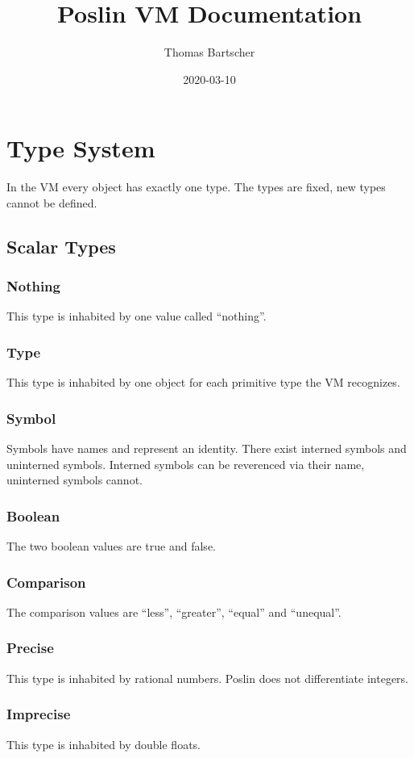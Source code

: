 \documentclass[a4paper]{article}
\begin{document}
\title{Poslin VM Documentation}
\author{Thomas Bartscher}
\date{2020-03-10}
\maketitle

\tableofcontents


\section{Type System}
In the VM every object has exactly one type. The types are fixed, new types
cannot be defined.

\subsection{Scalar Types}
\subsubsection{Nothing}
This type is inhabited by one value called ``nothing''.
\subsubsection{Type}
This type is inhabited by one object for each primitive type the VM recognizes.
\subsubsection{Symbol}
Symbols have names and represent an identity. There exist interned symbols and
uninterned symbols. Interned symbols can be reverenced via their name,
uninterned symbols cannot.
\subsubsection{Boolean}
The two boolean values are true and false.
\subsubsection{Comparison}
The comparison values are ``less'', ``greater'', ``equal'' and ``unequal''.
\subsubsection{Precise}
This type is inhabited by rational numbers. Poslin does not differentiate
integers.
\subsubsection{Imprecise}
This type is inhabited by double floats.
\end{document}
